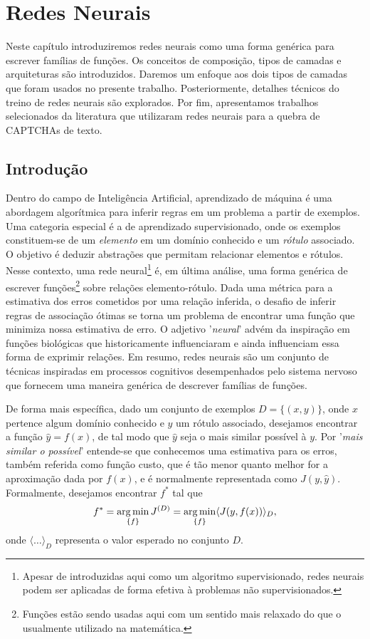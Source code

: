 \chapter{Redes Neurais} \label{cap:neurais}

Neste capítulo introduziremos redes neurais como uma forma genérica para escrever famílias de funções. Os conceitos de composição, tipos de camadas e arquiteturas são introduzidos. Daremos um enfoque aos dois tipos de camadas que foram usados no presente trabalho. Posteriormente, detalhes técnicos do treino de redes neurais são explorados. Por fim, apresentamos trabalhos selecionados da literatura que utilizaram redes neurais para a quebra de CAPTCHAs de texto.

\section{Introdução}

Dentro do campo de Inteligência Artificial, aprendizado de máquina é uma abordagem algorítmica para inferir regras em um problema a partir de exemplos. Uma categoria especial é a de aprendizado supervisionado, onde os exemplos constituem-se de um \textit{elemento} em um domínio conhecido e um \textit{rótulo} associado. O objetivo é deduzir abstrações que permitam relacionar elementos e rótulos. Nesse contexto, uma rede neural\footnote{Apesar de introduzidas aqui como um algoritmo supervisionado, redes neurais podem ser aplicadas de forma efetiva à problemas não supervisionados.} é, em última análise, uma forma genérica de escrever funções\footnote{Funções estão sendo usadas aqui com um sentido mais relaxado do que o usualmente utilizado na matemática.} sobre relações elemento-rótulo. Dada uma métrica para a estimativa dos erros cometidos por uma relação inferida, o desafio de inferir regras de associação ótimas se torna um problema de encontrar uma função que minimiza nossa estimativa de erro. O adjetivo '\textit{neural}' advém da inspiração em funções biológicas que historicamente influenciaram e ainda influenciam essa forma de exprimir relações. Em resumo, redes neurais são um conjunto de técnicas inspiradas em processos cognitivos desempenhados pelo sistema nervoso que fornecem uma maneira genérica de descrever famílias de funções.

De forma mais específica, dado um conjunto de exemplos $D = \{(x, y)\}$, onde $x$  pertence algum domínio conhecido e $y$ um rótulo associado, desejamos encontrar a função $\hat{y} = f(x)$, de tal modo que $\hat{y}$ seja o mais similar possível à $y$. Por '\textit{mais similar o possível}' entende-se que conhecemos uma estimativa para os erros, também referida como função custo, que é tão menor quanto melhor for a aproximação dada por $f(x)$, e é normalmente representada como $J(y, \hat{y})$. Formalmente, desejamos encontrar $f^*$ tal que
\begin{equation}
f^* = \operatorname*{arg\,min}_{\{f\}} J^{(D)} = \operatorname*{arg\,min}_{\{f\}} \langle J(y, f(x)) \rangle_{D},
\end{equation}   
onde $\langle \ldots \rangle_{D}$ representa o valor esperado no conjunto $D$.

